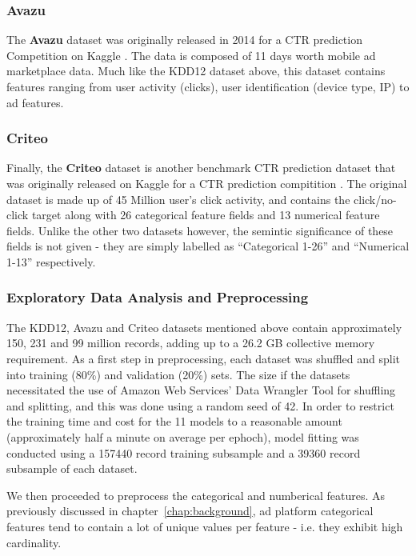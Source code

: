\documentclass{mldsmsc}
\begin{document}
\subsubsection{Avazu}

The \textbf{Avazu} dataset was originally released in 2014 for a CTR prediction 
Competition on Kaggle \citep{RefWorks:wang2014click-through}. The data is 
composed of 11 days worth mobile ad marketplace data. Much like the KDD12 
dataset above, this dataset contains features ranging from user activity 
(clicks), user identification (device type, IP) to ad features.

\subsubsection{Criteo}

Finally, the \textbf{Criteo} dataset is another benchmark CTR prediction dataset 
that was originally released on Kaggle for a CTR prediction compitition \citep{RefWorks:tien2014display}. 
The original dataset is made up of 45 Million user's click activity, and 
contains the click/no-click target along with 26 categorical feature 
fields and 13 numerical feature fields. Unlike the other two datasets 
however, the semintic significance of these fields is not given - they 
are simply labelled as ``Categorical 1-26'' and ``Numerical 1-13'' 
respectively.

\subsubsection{Exploratory Data Analysis and Preprocessing}

The KDD12, Avazu and Criteo datasets mentioned above contain approximately 150, 231
and 99 million records, adding up to a 26.2 GB collective memory requirement.
As a first step in preprocessing, each dataset was shuffled and split into training (80\%) and validation (20\%)
sets. The size if the datasets necessitated the use of Amazon Web Services'
Data Wrangler Tool \citep{AWSDataWrangler} for shuffling and splitting, and this was done using a random seed of 42.
In order to restrict the training time and cost for the 11 models to a reasonable
amount (approximately half a minute on average per ephoch), model fitting was conducted using a 157440 record
training subsample and a 39360 record
subsample of each dataset.

We then proceeded to preprocess the categorical and numberical features. As previously
discussed in chapter~\ref{chap:background}, ad platform categorical features tend to contain
a lot of unique values per feature - i.e. they exhibit high cardinality.
\end{document}
